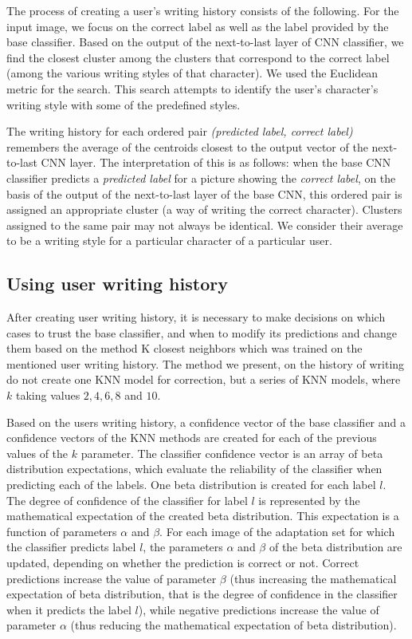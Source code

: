 \documentclass{article}
\begin{document}
The process of creating a user's writing history consists of the following.
For the input image, we focus on the correct label as well as the label provided by the base classifier.
Based on the output of the next-to-last layer of CNN classifier, we find the closest cluster among the clusters that correspond to the correct label (among the various writing styles of that character).
We used the Euclidean metric for the search. %
This search attempts to identify the user's character's writing style with some of the predefined styles.

The writing history for each ordered pair \textit{(predicted label, correct label)} remembers the average of the centroids closest to the output vector of the next-to-last CNN layer.
The interpretation of this is as follows: when the base CNN classifier predicts %
 a \textit{predicted label} for a picture showing the \textit{correct label},
on the basis of the output of the next-to-last layer of the base CNN, this ordered pair is assigned an appropriate cluster (a way of writing the correct character).
Clusters assigned to the same pair may not always be identical.
We consider their average to be a writing style for a particular character of a particular user.

\subsection{Using user writing history}

After creating user writing history, it is necessary to make decisions on which cases to trust the base classifier, and when to modify its predictions and change them based on the method K closest neighbors
which was trained on the mentioned user writing history.
The method we present, on the history of writing do not create one KNN model for correction, but a series of KNN models, where $k$ taking values $2, 4, 6, 8$ and $10$.

Based on the users writing history, a confidence vector of the base classifier and a confidence vectors of the KNN methods are created for each of the previous values of the $k$ parameter.
The classifier confidence vector is an array of beta distribution expectations, which evaluate the reliability of the classifier when predicting each of the labels.
One beta distribution is created for each label $l$.
The degree of confidence of the classifier for label $l$ is represented by the mathematical expectation of the created beta distribution.
This expectation is a function of parameters $\alpha$  and $\beta$.
For each image of the adaptation set for which the classifier predicts label $l$, the parameters $\alpha$  and $\beta$ of the beta distribution are updated, depending on whether the prediction is correct or not.
Correct predictions increase the value of parameter $\beta$
(thus increasing the mathematical expectation of beta distribution, that is the degree of confidence in the classifier when it predicts the label $l$),
while negative predictions increase the value of parameter $\alpha$
(thus reducing the mathematical expectation of beta distribution).
\end{document}
